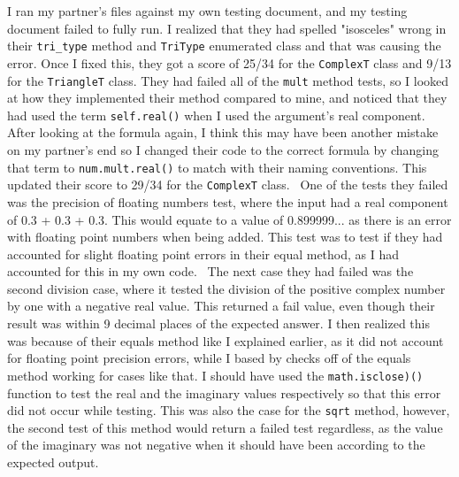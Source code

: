 \documentclass[12pt]{article}
\begin{document}
I ran my partner's files against my own testing document, and my testing document failed to fully run. I realized that they had spelled "isosceles" wrong in their \verb|tri_type| method and \verb|TriType| enumerated class and that was causing the error. Once I fixed this, they got a score of 25/34 for the \verb|ComplexT| class and 9/13 for the \verb|TriangleT| class. They had failed all of the \verb|mult| method tests, so I looked at how they implemented their method compared to mine, and noticed that they had used the term \verb|self.real()| when I used the argument's real component. After looking at the formula again, I think this may have been another mistake on my partner's end so I changed their code to the correct formula by changing that term to \verb|num.mult.real()| to match with their naming conventions. This updated their score to 29/34 for the \verb|ComplexT| class. 
~\newline\noindent One of the tests they failed was the precision of floating numbers test, where the input had a real component of 0.3 + 0.3 + 0.3. This would equate to a value of 0.899999... as there is an error with floating point numbers when being added. This test was to test if they had accounted for slight floating point errors in their equal method, as I had accounted for this in my own code. 
~\newline\noindent The next case they had failed was the second division case, where it tested the division of the positive complex number by one with a negative real value. This returned a fail value, even though their result was within 9 decimal places of the expected answer. I then realized this was because of their equals method like I explained earlier, as it did not account for floating point precision errors, while I based by checks off of the equals method working for cases like that. I should have used the \verb|math.isclose)()| function to test the real and the imaginary values respectively so that this error did not occur while testing. This was also the case for the \verb|sqrt| method, however, the second test of this method would return a failed test regardless, as the value of the imaginary was not negative when it should have been according to the expected output. 
\end{document}

